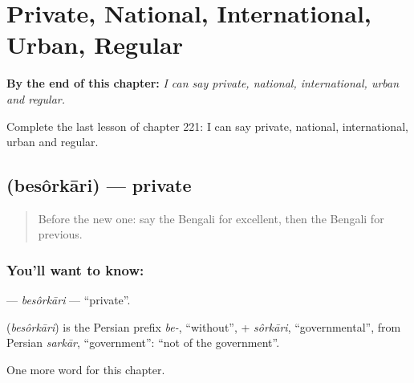 
\chapter{Private, National, International, Urban, Regular}
\label{ch:bn-private-national-international-urban-regular}

\begin{chapteropening}
\textbf{By the end of this chapter:} \emph{I can say private, national, international, urban and regular.}

Complete the last lesson of chapter 221: I can say private, national, international, urban and regular.
\end{chapteropening}

\section[\texorpdfstring{\bn{বেসরকারি} (besôrkāri)}{বেসরকারি (besôrkāri)}]{ (besôrkāri) — private}

\label{lesson:BN-C221-besorkari}



\begin{quote}
Before the new one: say the Bengali for excellent, then the Bengali for previous.
\end{quote}

\subsection*{You'll want to know: }
\textbf{} — \emph{besôrkāri} — \textquotedblleft{}private\textquotedblright{}.

\begin{cousinweb}
\textbf{} (\emph{besôrkāri}) is the Persian prefix \emph{be-}, \textquotedblleft{}without\textquotedblright{}, + \emph{sôrkāri}, \textquotedblleft{}governmental\textquotedblright{}, from Persian \emph{sarkār}, \textquotedblleft{}government\textquotedblright{}: \textquotedblleft{}not of the government\textquotedblright{}.
\end{cousinweb}

\begin{grammarlens}[title={What you've built}]
One more word for this chapter.
\end{grammarlens}


